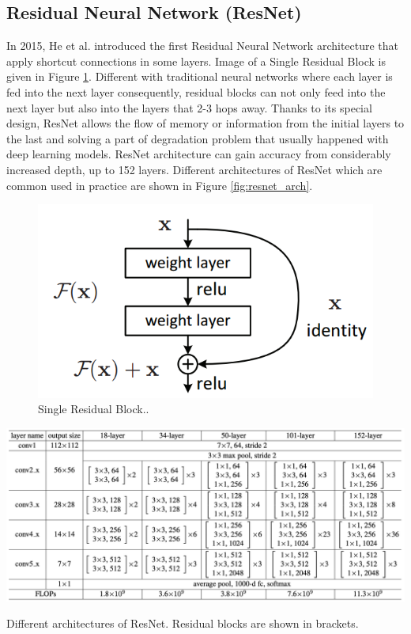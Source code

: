 \subsection{Residual Neural Network (ResNet)}
In 2015, He et al. introduced the first Residual Neural Network \cite{Resnet} architecture that apply shortcut connections in some layers. Image of a Single Residual Block is given in Figure \ref{fig:single_res}. Different with traditional neural networks where each layer is fed into the next layer consequently, residual blocks can not only feed into the next layer but also into the layers that 2-3 hops away. Thanks to its special design, ResNet allows the flow of memory or information from the initial layers to the last and solving a part of degradation problem that usually happened with deep learning models. ResNet architecture can gain accuracy from considerably increased depth, up to 152 layers. Different architectures of ResNet which are common used in practice are shown in Figure \ref{fig:resnet_arch}.

\begin{figure}[thb]
	\centering \includegraphics[width=0.5\columnwidth]{endoscopy_resources/single_residual_block.png}
	\caption[Single Residual Block.]{Single Residual Block.\footnotemark.}
	\label{fig:single_res}
\end{figure}

\begin{table}[thb]
    \centering
    \includegraphics[width=\textwidth]{endoscopy_resources/resnet_archi.png}
    \caption{Different architectures of ResNet. Residual blocks are shown in brackets. \cite{Resnet}}
    \label{fig:resnet_arch}
\end{table}

